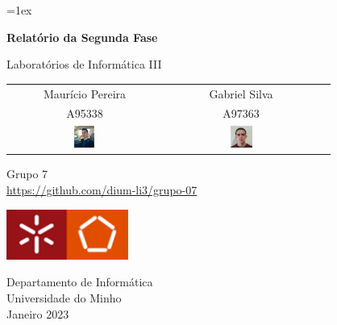 \documentclass[12pt,a4paper]{article}
\date{\today}
\begin{document}
\font=1ex

\begin{titlepage}
   \begin{center}
       \vspace*{0.5cm}

       \textbf{\Huge Relatório da Segunda Fase}

       \vspace{0.5cm}
       
      \large Laboratórios de Informática III
            
       \vspace{1.5 cm}
       \begin{tabular}{c c c}
         
           Maurício Pereira & Gabriel Silva\\
            A95338 & A97363 \\
            \includegraphics[width=0.15\textwidth]{imagens/fotos/A95338.png}
            & 
             \includegraphics[width=0.15\textwidth]{imagens/fotos/A97363.png}
       \end{tabular}

       \vfill
       \vspace{0.3cm}
        \large
       Grupo 7 \\
       \href{https://github.com/dium-li3/grupo-07}{https://github.com/dium-li3/grupo-07} \\
       \vspace{0.8cm}
       
       \begin{center}
           \includegraphics[width=0.3\textwidth]{imagens/capa/um.png}
       \end{center}
       
       \normalsize
       Departamento de Informática\\
       Universidade do Minho\\
       Janeiro 2023
            
   \end{center}
   
\end{titlepage}
\end{document}
